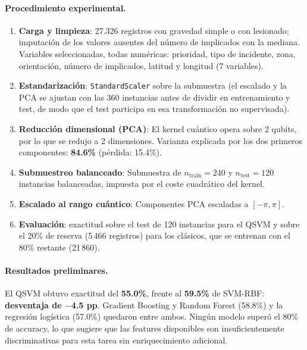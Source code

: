 \paragraph{Procedimiento experimental.}
\begin{enumerate}
  \item \textbf{Carga y limpieza}: 27.326 registros con gravedad simple o con lesionado; imputación de los valores ausentes del número de implicados con la mediana. Variables seleccionadas, todas numéricas: prioridad, tipo de incidente, zona, orientación, número de implicados, latitud y longitud (7 variables).
  \item \textbf{Estandarización}: \texttt{StandardScaler} sobre la submuestra (el escalado y la PCA se ajustan con las 360 instancias antes de dividir en entrenamiento y test, de modo que el test participa en esa transformación no supervisada).
  \item \textbf{Reducción dimensional (PCA)}: El kernel cuántico opera sobre 2 qubits, por lo que se redujo a 2 dimensiones. Varianza explicada por los dos primeros componentes: \textbf{84.6\%} (pérdida: 15.4\%).
  \item \textbf{Submuestreo balanceado}: Submuestra de $n_{\text{train}} = 240$ y $n_{\text{test}} = 120$ instancias balanceadas, impuesta por el coste cuadrático del kernel.
  \item \textbf{Escalado al rango cuántico}: Componentes PCA escaladas a $[-\pi, \pi]$.
  \item \textbf{Evaluación}: exactitud sobre el test de 120 instancias para el QSVM y sobre el 20\% de reserva (5\,466 registros) para los clásicos, que se entrenan con el 80\% restante (21\,860).
\end{enumerate}

\paragraph{Resultados preliminares.}
El QSVM obtuvo exactitud del \textbf{55.0\%}, frente al \textbf{59.5\%} de SVM-RBF: \textbf{desventaja de $-$4.5 pp}. Gradient Boosting y Random Forest (58.8\%) y la regresión logística (57.0\%) quedaron entre ambos. Ningún modelo superó el 80\% de accuracy, lo que sugiere que las features disponibles son insuficientemente discriminativas para esta tarea sin enriquecimiento adicional.

